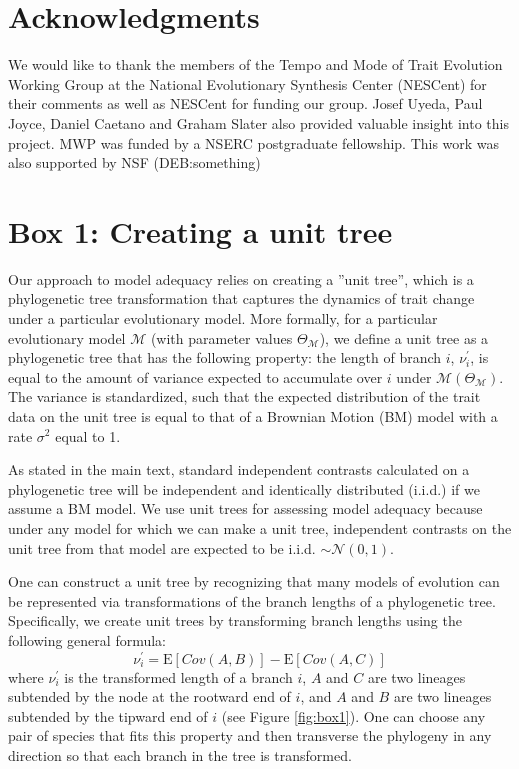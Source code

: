 \documentclass[a4paper,12pt]{article}
\begin{document}
\section{Acknowledgments}
We would like to thank the members of the Tempo and Mode of Trait Evolution Working Group at the National Evolutionary Synthesis Center (NESCent) for their comments as well as NESCent for funding our group. Josef Uyeda, Paul Joyce, Daniel Caetano and Graham Slater also provided valuable insight into this project. MWP was funded by a NSERC postgraduate fellowship. This work was also supported by NSF (DEB:something)

\newpage
\section{Box 1: Creating a unit tree}

Our approach to model adequacy relies on creating a ''unit tree'', which is a phylogenetic tree transformation that captures the dynamics of trait change under a particular evolutionary model. More formally, for a particular evolutionary model $\mathcal{M}$ (with parameter values $\Theta_{\mathcal{M}}$), we define a unit tree as a phylogenetic tree that has the following property: the length of branch $i$, $\nu_i ^\prime$, is equal to the amount of variance expected to accumulate over $i$ under $\mathcal{M}(\Theta_{\mathcal{M}})$. The variance is standardized, such that the expected distribution of the trait data on the unit tree is equal to that of a Brownian Motion (BM) model with a rate $\sigma^2$ equal to 1. 

As stated in the main text, standard independent contrasts calculated on a phylogenetic tree will be independent and identically distributed (i.i.d.) if we assume a BM model. We use unit trees for assessing model adequacy because under any model for which we can make a unit tree, independent contrasts on the unit tree from that model are expected to be i.i.d. $\sim \mathcal{N}(0,1)$.

One can construct a unit tree by recognizing that many models of evolution can be represented via transformations of the branch lengths of a phylogenetic tree. Specifically, we create unit trees by transforming branch lengths using the following general formula:
\begin{equation}
\nu_i^\prime = \mathrm{E}[Cov(A,B)] - \mathrm{E}[Cov(A,C)]
\end{equation}
where $\nu_i^\prime$ is the transformed length of a branch $i$, $A$ and $C$ are two lineages subtended by the node at the rootward end of $i$, and $A$ and $B$ are two lineages subtended by the tipward end of $i$ (see Figure \ref{fig:box1}). One can choose any pair of species that fits this property and then transverse the phylogeny in any direction so that each branch in the tree is transformed. 
\end{document}
